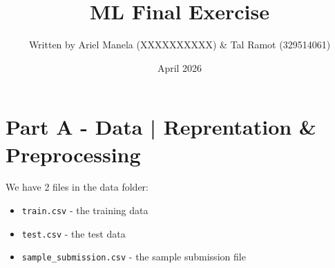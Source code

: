 \documentclass[11pt]{article}
\title{ML Final Exercise}
\author{Written by Ariel Manela (XXXXXXXXXX) \& Tal Ramot (329514061)}
\date{April 2026}
\begin{document}
\maketitle

\section{Part A - Data | Reprentation \& Preprocessing}
We have 2 files in the data folder:
\begin{itemize}
    \item \texttt{train.csv} - the training data
    \item \texttt{test.csv} - the test data
    \item \texttt{sample\_submission.csv} - the sample submission file
\end{itemize}
\end{document}
